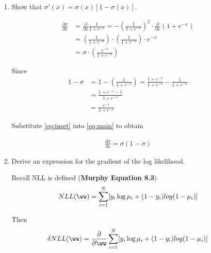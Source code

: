 \documentclass[12pt,letterpaper]{hmcpset}
\begin{document}
\begin{solution}

\begin{enumerate}		
\item Show that $\sigma'(x) = \sigma(x)\left[1 - \sigma(x)\right].$

\begin{equation}\begin{aligned}
\frac{\partial \sigma}{\partial x} \label{eq:main} & = \frac{\partial }{\partial x} \frac{1}{1 + e^{-x}} = -( \frac{1}{1 + e^{-x}} )^2 \cdot \frac{\partial }{\partial x} ( 1 + e^{-x} ) \\
& = ( \frac{1}{1 + e^{-x}} ) \cdot ( \frac{1}{1 + e^{-x}} ) \cdot e^{-x} \\
& = \sigma \cdot ( \frac{ e^{-x} }{1 + e^{-x}} )
\end{aligned}\end{equation}

Since
\begin{equation}\begin{aligned}
  1 - \sigma \label{eq:inset} & = 1 - ( \frac{1}{1 + e^{-x}} ) = \frac{1 + e^{-x}}{1 + e^{-x}} - \frac{1}{1 + e^{-x}} \\
  & = \frac{1 + e^{-x} - 1}{1 + e^{-x}} \\
  & = \frac{e^{-x}}{1 + e^{-x}}
\end{aligned}\end{equation}

Substitute \eqref{eq:inset} into \eqref{eq:main} to obtain

\begin{equation}\begin{aligned}
  \frac{\partial \sigma}{\partial x} = \sigma(1 - \sigma)
\end{aligned}\end{equation}

\item Derive an expression for the gradient of the log likelihood.

  Recall NLL is defined (\textbf{Murphy Equation 8.3})
\begin{equation}\begin{aligned}
NLL(\ww) = \sum_{i=1}^N [ y_i \log \mu_i + (1 - y_i)log(1 - \mu_i) ]
\end{aligned}\end{equation}

Then 
\begin{equation}\begin{aligned}
\delta NLL (\ww) = \frac{\partial}{\partial \ww} \sum_{i=1}^N [ y_i \log \mu_i + (1 - y_i)log(1 - \mu_i) ]
\end{aligned}\end{equation}


\end{enumerate}
\end{solution}
\end{document}
